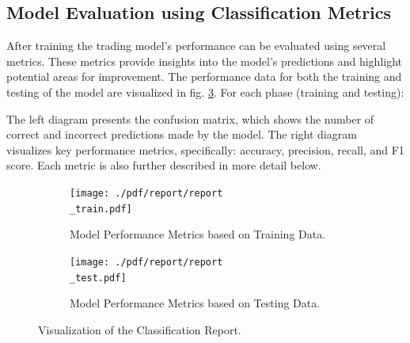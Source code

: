 \subsection{Model Evaluation using Classification Metrics}
After training the trading model's performance can be evaluated using several metrics. These metrics provide insights into the model's predictions and highlight potential areas for improvement.
The performance data for both the training and testing of the model are visualized in fig. \ref{fig:conf_matrix}.
For each phase (training and testing):

The left diagram presents the confusion matrix, which shows the number of correct and incorrect predictions made by the model.
The right diagram visualizes key performance metrics, specifically: accuracy, precision, recall, and F1 score. Each metric is also further described in  more detail below.
\begin{figure}[H]
    \centering

    \begin{subfigure}[b]{\textwidth}
        \begin{adjustbox}{max width=0.8\textwidth,center}
            \texttt{[image: ./pdf/report/report\\\_train.pdf]}
        \end{adjustbox}
        \caption{Model Performance Metrics based on Training Data.}
        \label{fig:train_perf}
    \end{subfigure}

    \bigskip %

    \begin{subfigure}[b]{\textwidth}
        \begin{adjustbox}{max width=0.8\textwidth,center}
            \texttt{[image: ./pdf/report/report\\\_test.pdf]}
        \end{adjustbox}
        \caption{Model Performance Metrics based on Testing Data.}
        \label{fig:test_perf}
    \end{subfigure}

    \caption{Visualization of the Classification Report.}
    \label{fig:conf_matrix}
\end{figure}

